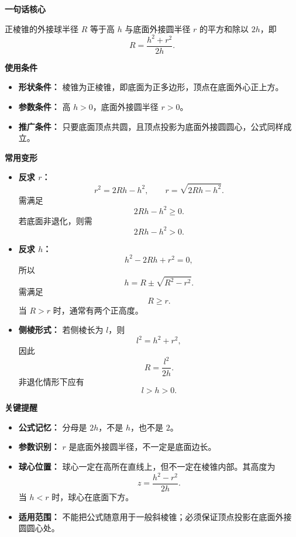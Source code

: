 \begin{summarybox}

	\textbf{\textcolor{CSummary}{一句话核心}}

	正棱锥的外接球半径 $R$ 等于高 $h$ 与底面外接圆半径 $r$ 的平方和除以 $2h$，即
	\[
		R=\frac{h^2+r^2}{2h}.
	\]

	\medskip
	\textbf{\textcolor{CSummary}{使用条件}}
	\begin{itemize}[leftmargin=*, itemsep=0.5em, topsep=0.4em]
		\item \textbf{形状条件：} 棱锥为正棱锥，即底面为正多边形，顶点在底面外心正上方。
		\item \textbf{参数条件：} 高 $h>0$，底面外接圆半径 $r>0$。
		\item \textbf{推广条件：} 只要底面顶点共圆，且顶点投影为底面外接圆圆心，公式同样成立。
	\end{itemize}

	\medskip
	\textbf{\textcolor{CSummary}{常用变形}}
	\begin{itemize}[leftmargin=*, itemsep=0.5em, topsep=0.4em]
		\item \textbf{反求 $r$：}
		      \[
			      r^2=2Rh-h^2,\qquad r=\sqrt{2Rh-h^2}.
		      \]
		      需满足
		      \[
			      2Rh-h^2\ge0.
		      \]
		      若底面非退化，则需
		      \[
			      2Rh-h^2>0.
		      \]

		\item \textbf{反求 $h$：}
		      \[
			      h^2-2Rh+r^2=0,
		      \]
		      所以
		      \[
			      h=R\pm\sqrt{R^2-r^2}.
		      \]
		      需满足
		      \[
			      R\ge r.
		      \]
		      当 $R>r$ 时，通常有两个正高度。

		\item \textbf{侧棱形式：} 若侧棱长为 $l$，则
		      \[
			      l^2=h^2+r^2,
		      \]
		      因此
		      \[
			      R=\frac{l^2}{2h}.
		      \]
		      非退化情形下应有
		      \[
			      l>h>0.
		      \]
	\end{itemize}

	\medskip
	\textbf{\textcolor{CSummary}{关键提醒}}
	\begin{itemize}[leftmargin=*, itemsep=0.5em, topsep=0.4em]
		\item \textbf{公式记忆：} 分母是 $2h$，不是 $h$，也不是 $2$。
		\item \textbf{参数识别：} $r$ 是底面外接圆半径，不一定是底面边长。
		\item \textbf{球心位置：} 球心一定在高所在直线上，但不一定在棱锥内部。其高度为
		      \[
			      z=\frac{h^2-r^2}{2h}.
		      \]
		      当 $h<r$ 时，球心在底面下方。
		\item \textbf{适用范围：} 不能把公式随意用于一般斜棱锥；必须保证顶点投影在底面外接圆圆心处。
	\end{itemize}

\end{summarybox}